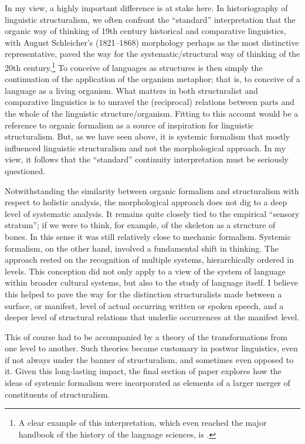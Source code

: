 \documentclass[output=paper]{langscibook}
\begin{document}
In my view, a highly important difference is at stake here. In historiography of linguistic structuralism, we often confront the ``standard'' interpretation that the organic way of thinking of 19th century historical and comparative linguistics, with August Schleicher's (1821--1868) morphology perhaps as the most distinctive representative, paved the way for the systematic/structural way of thinking of the 20th century.\footnote{A clear example of this interpretation, which even reached the major handbook of the history of the language sciences, is \citet{Kohrt2001}.} To conceive of languages as structures is then simply the continuation of the application of the organism metaphor; that is, to conceive of a language as a living organism. What matters in both structuralist and comparative linguistics is to unravel the (reciprocal) relations between parts and the whole of the linguistic structure/organism. Fitting to this account would be a reference to organic formalism as a source of inspiration for linguistic structuralism. But, as we have seen above, it is systemic formalism that mostly influenced linguistic structuralism and not the morphological approach. In my view, it follows that the ``standard'' continuity interpretation must be seriously questioned. 

Notwithstanding the similarity between organic formalism and structuralism with respect to holistic analysis, the morphological approach does not dig to a deep level of systematic analysis. It remains quite closely tied to the empirical ``sensory stratum''; if we were to think, for example, of the skeleton as a structure of bones. In this sense it was still relatively close to mechanic formalism. Systemic formalism, on the other hand, involved a fundamental shift in thinking. The approach rested on the recognition of multiple systems, hierarchically ordered in levels. This conception did not only apply to a view of the system of language within broader cultural systems, but also to the study of language itself. I believe this helped to pave the way for the distinction structuralists made between a surface, or manifest, level of actual occurring written or spoken speech, and a deeper level of structural relations that underlie occurrences at the manifest level.

This of course had to be accompanied by a theory of the transformations from one level to another. Such theories became customary in postwar linguistics, even if not always under the banner of structuralism, and sometimes even opposed to it. Given this long-lasting impact, the final section of paper explores how the ideas of systemic formalism were incorporated as elements of a larger merger of constituents of structuralism.
\end{document}
